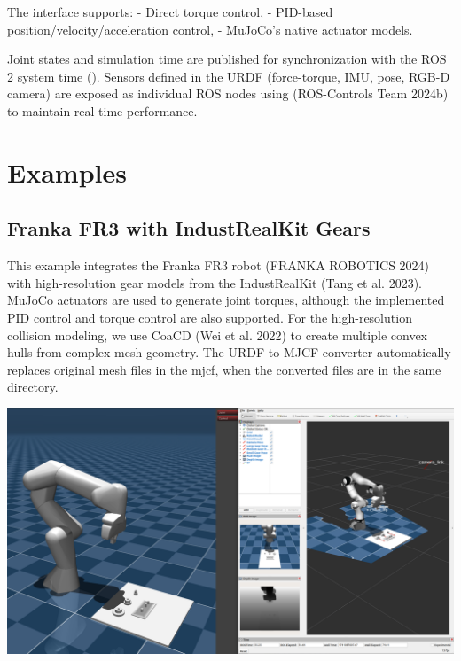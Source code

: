 \documentclass[10pt,a4paper,onecolumn]{article}
\let\origfigure\figure
\let\endorigfigure\endfigure
\renewenvironment{figure}[1][2] {
    \expandafter\origfigure\expandafter[H]
} {
    \endorigfigure
}
\let\textttOrig=\texttt
\def\texttt#1{\expandafter\textttOrig{\seqsplit{#1}}}
\begin{document}
The interface supports: - Direct torque control, - PID-based
position/velocity/acceleration control, - MuJoCo's native actuator
models.

Joint states and simulation time are published for synchronization with
the ROS 2 system time (\texttt{/clock}). Sensors defined in the URDF
(force-torque, IMU, pose, RGB-D camera) are exposed as individual ROS
nodes using \texttt{realtime\_tools} (ROS-Controls Team 2024b) to
maintain real-time performance.

\hypertarget{examples}{%
\section{Examples}\label{examples}}

\hypertarget{franka-fr3-with-industrealkit-gears}{%
\subsection{Franka FR3 with IndustRealKit
Gears}\label{franka-fr3-with-industrealkit-gears}}

This example integrates the Franka FR3 robot (FRANKA ROBOTICS 2024) with
high-resolution gear models from the IndustRealKit (Tang et al. 2023).
MuJoCo actuators are used to generate joint torques, although the
implemented PID control and torque control are also supported. For the
high-resolution collision modeling, we use CoaCD (Wei et al. 2022) to
create multiple convex hulls from complex mesh geometry. The
URDF-to-MJCF converter automatically replaces original mesh files in the
mjcf, when the converted files are in the same directory.

\begin{figure}
\centering
\includegraphics{./figures/franka_rgbd_example.png}
\caption{Franka FR3 controlled with ROS 2 Joint Trajectory Controller}
\end{figure}
\end{document}
